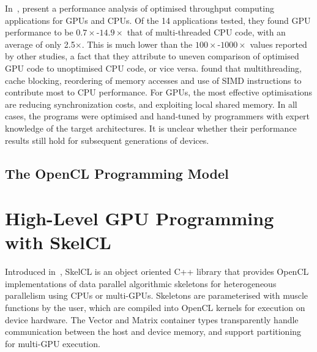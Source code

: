 In~\cite{Lee2010}, \citeauthor{Lee2010} present a performance analysis
of optimised throughput computing applications for GPUs and CPUs. Of
the 14 applications tested, they found GPU performance to be
$0.7\times$-$14.9\times$ that of multi-threaded CPU code, with an
average of only 2.5$\times$. This is much lower than the
$100\times$-$1000\times$ values reported by other studies,
a fact that they attribute to uneven comparison of optimised GPU code
to unoptimised CPU code, or vice versa. \citeauthor{Lee2010} found
that multithreading, cache blocking, reordering of memory accesses and
use of SIMD instructions to contribute most to CPU performance. For
GPUs, the most effective optimisations are reducing synchronization
costs, and exploiting local shared memory. In all cases, the programs
were optimised and hand-tuned by programmers with expert knowledge of
the target architectures. It is unclear whether their performance
results still hold for subsequent generations of devices.


\subsection{The OpenCL Programming Model}



\section{High-Level GPU Programming with SkelCL}\label{sec:skelcl-intro}

Introduced in~\cite{Steuwer2011}, SkelCL is an object oriented C++
library that provides OpenCL implementations of data parallel
algorithmic skeletons for heterogeneous parallelism using CPUs or
multi-GPUs. Skeletons are parameterised with muscle functions by the
user, which are compiled into OpenCL kernels for execution on device
hardware. The Vector and Matrix container types transparently handle
communication between the host and device memory, and support
partitioning for multi-GPU execution.

